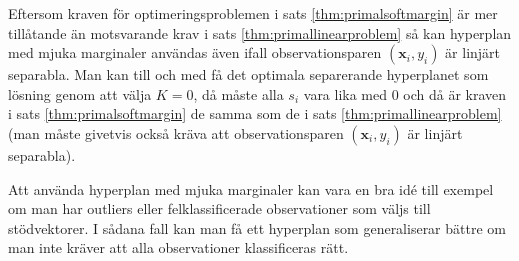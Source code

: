 \documentclass[a4paper, 12pt]{report}
\theoremstyle{definition}
\theoremstyle{remark}
\newtheorem*{rem}{Observation}
\newcommand{\bfx}{\mathbf{x}}
\begin{document}
Eftersom kraven för optimeringsproblemen i sats \ref{thm:primalsoftmargin} är mer tillåtande än motsvarande krav i sats \ref{thm:primallinearproblem} så kan hyperplan med mjuka marginaler användas även ifall observationsparen $\left(\mathbf{x}_i, y_i\right)$ är linjärt separabla. Man kan till och med få det optimala separerande hyperplanet som lösning genom att välja $K=0$, då måste alla $s_i$ vara lika med 0 och då är kraven i sats \ref{thm:primalsoftmargin} de samma som de i sats \ref{thm:primallinearproblem} (man måste givetvis också kräva att observationsparen $\left(\bfx_i, y_i\right)$ är linjärt separabla).

Att använda hyperplan med mjuka marginaler kan vara en bra idé till exempel om man har outliers eller felklassificerade observationer som väljs till stödvektorer. I sådana fall kan man få ett hyperplan som generaliserar bättre om man inte kräver att alla observationer klassificeras rätt.


\end{document}
